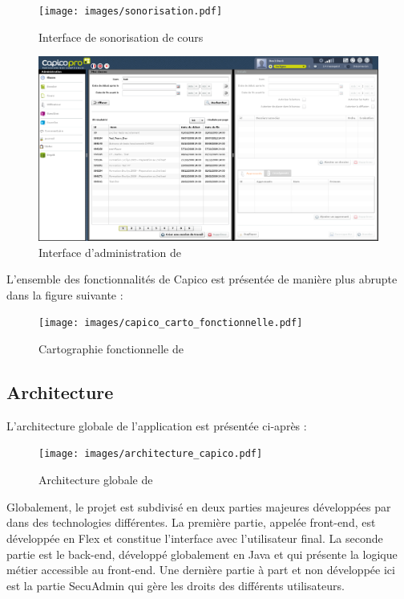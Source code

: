 \begin{figure}[H]
	\centering
	\texttt{[image: images/sonorisation.pdf]}
	\caption{Interface de sonorisation de cours}
	\label{fig:sonorisation}
\end{figure}

\begin{figure}[H]
	\centering
	\includegraphics[width=\textwidth]{images/administration.png}
	\caption{Interface d'administration de \capico{}}
	\label{fig:administration}
\end{figure}

L'ensemble des fonctionnalités de Capico est présentée de manière plus abrupte dans la figure suivante :

\begin{figure}[H]
	\centering
	\texttt{[image: images/capico\_carto\_fonctionnelle.pdf]}
	\caption{Cartographie fonctionnelle de \capico{}}
\end{figure}

\subsection{Architecture}

L'architecture globale de l'application est présentée ci-après :

\begin{figure}[H]
	\centering
	\texttt{[image: images/architecture\_capico.pdf]}
	\caption{Architecture globale de \capico{}}
\end{figure}

Globalement, le projet est subdivisé en deux parties majeures développées par \excilys{} dans des technologies différentes. La première partie, appelée \flqq{}front-end\frqq{}, est développée en Flex et constitue l'interface avec l'utilisateur final. La seconde partie est le \flqq{}back-end\frqq{}, développé globalement en Java et qui présente la logique métier accessible au front-end. Une dernière partie à part et non développée ici est la partie SecuAdmin qui gère les droits des différents utilisateurs.\\

